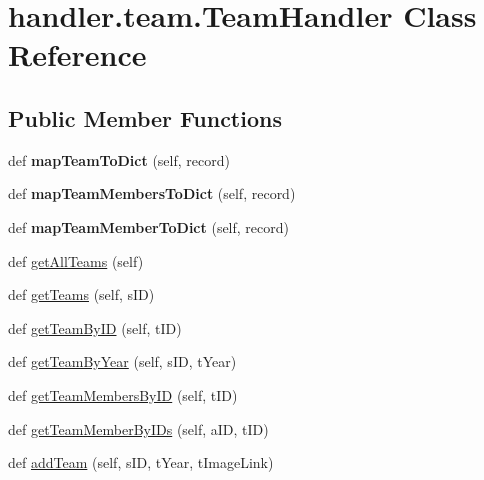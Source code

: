 \hypertarget{classhandler_1_1team_1_1_team_handler}{}\section{handler.\+team.\+Team\+Handler Class Reference}
\label{classhandler_1_1team_1_1_team_handler}
\subsection*{Public Member Functions}
\begin{DoxyCompactItemize}
\item 
\mbox{\label{classhandler_1_1team_1_1_team_handler_a59e89a80e2c761139bd0a17ac13f271c}} 
def {\bfseries map\+Team\+To\+Dict} (self, record)
\item 
\mbox{\label{classhandler_1_1team_1_1_team_handler_a6fc415c48d6b7057ecb60dc5f7f3fdb1}} 
def {\bfseries map\+Team\+Members\+To\+Dict} (self, record)
\item 
\mbox{\label{classhandler_1_1team_1_1_team_handler_a931e32e4ac7e2a47c95ca4707fbbe034}} 
def {\bfseries map\+Team\+Member\+To\+Dict} (self, record)
\item 
def \hyperlink{classhandler_1_1team_1_1_team_handler_acc2d42a1a0a2120c25425708fc3274e5}{get\+All\+Teams} (self)
\item 
def \hyperlink{classhandler_1_1team_1_1_team_handler_aeb227f1fec1cfad96ce56cf7de054552}{get\+Teams} (self, s\+ID)
\item 
def \hyperlink{classhandler_1_1team_1_1_team_handler_ad8844435c8d6951748a7dc17702a2a19}{get\+Team\+By\+ID} (self, t\+ID)
\item 
def \hyperlink{classhandler_1_1team_1_1_team_handler_a4ee11f08a2e69e4a250527c9fea26190}{get\+Team\+By\+Year} (self, s\+ID, t\+Year)
\item 
def \hyperlink{classhandler_1_1team_1_1_team_handler_a01c7ec029ad084fb936ef9c90ef3a1c0}{get\+Team\+Members\+By\+ID} (self, t\+ID)
\item 
def \hyperlink{classhandler_1_1team_1_1_team_handler_a1a00f6d69828c15ce2da7b4215c868cf}{get\+Team\+Member\+By\+I\+Ds} (self, a\+ID, t\+ID)
\item 
def \hyperlink{classhandler_1_1team_1_1_team_handler_a5210c4faddfd528492c3ce454a1aed95}{add\+Team} (self, s\+ID, t\+Year, t\+Image\+Link)

\end{DoxyCompactItemize}
